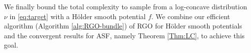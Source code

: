 \documentclass[11pt,letterpaper]{article}
\newcommand{\tx}{\tilde x}
\newcommand{\red}[1]{\textcolor{red}{#1}}
\begin{document}












We finally bound the total complexity to sample from a log-concave distribution $\nu$ in \eqref{eq:target} with a Hölder smooth potential $f$. We combine our efficient algorithm (Algorithm \ref{alg:RGO-bundle}) of RGO for Hölder smooth potentials and the convergent results for ASF, namely Theorem \ref{Thm:LC}, to achieve this goal.
\end{document}
